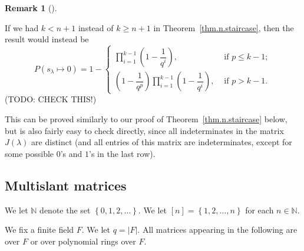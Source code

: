 \documentclass[numbers=enddot,12pt,final,onecolumn,notitlepage]{scrartcl}%
\theoremstyle{definition}
\newtheorem{remk}[theo]{Remark}
\newenvironment{remark}[1][]
{\begin{remk}[#1]\begin{leftbar}}
{\end{leftbar}\end{remk}}
\let\prodnonlimits\prod
\renewcommand{\prod}{\prodnonlimits\limits}
\newenvironment{noncompile}{}{}
\newcommand{\tup}[1]{\left( #1 \right)}
\renewcommand{\leq}{\leqslant}
\renewcommand{\geq}{\geqslant}
\theoremstyle{plainsl}
\begin{document}
\begin{remark}
\label{rem.sizenstairs}
If we had $k < n+1$ instead of $k \geq n+1$
in Theorem~\ref{thm.n.staircase}, then the result would instead be
\[
P(s_{\lambda} \longmapsto 0) =
1 -
\begin{cases}
\prod_{i=1}^{k-1} \left(  1-\dfrac{1}{q^{i}}\right) ,
& \text{ if } p \leq k-1; \\
\tup{1 - \dfrac{1}{q^p}}
\prod_{i=1}^{k-1} \left(  1-\dfrac{1}{q^{i}}\right) ,
& \text{ if } p > k-1.
\end{cases}
\]
(TODO: CHECK THIS!)

This can be proved similarly to our proof of Theorem~\ref{thm.n.staircase} below,
but is also fairly easy to check directly, since all indeterminates
in the matrix $J\tup{\lambda}$ are distinct (and all entries of this
matrix are indeterminates, except for some possible $0$'s and $1$'s
in the last row).

\end{remark}


\subsection{Multislant matrices}

We let $\mathbb{N}$ denote the set $\left\{  0,1,2,\ldots\right\}  $. We let
$\left[  n\right]  =\left\{  1,2,\ldots,n\right\}  $ for each $n\in\mathbb{N}$.

We fix a finite field $F$. We let $q=\left\vert F\right\vert $. All matrices
appearing in the following are over $F$ or over polynomial rings over $F$.

\end{document}
